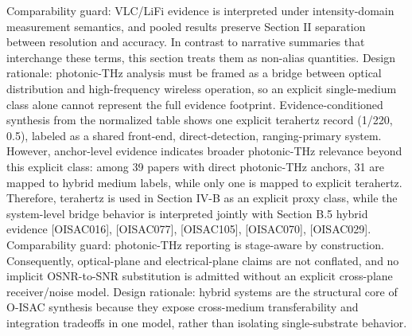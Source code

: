 {}Comparability guard: VLC/LiFi evidence is interpreted under intensity-domain measurement semantics, and pooled results preserve Section II separation between resolution and accuracy. In contrast to narrative summaries that interchange these terms, this section treats them as non-alias quantities.\markdownRendererInterblockSeparator
{}
\markdownRendererSectionEnd \markdownRendererSectionBegin
{}\markdownRendererInterblockSeparator
{}Design rationale: photonic-THz analysis must be framed as a bridge between optical distribution and high-frequency wireless operation, so an explicit single-medium class alone cannot represent the full evidence footprint.\markdownRendererParagraphSeparator
{}Evidence-conditioned synthesis from the normalized table shows one explicit terahertz record (1/220, 0.5\markdownRendererPercentSign{}), labeled as a shared front-end, direct-detection, ranging-primary system. However, anchor-level evidence indicates broader photonic-THz relevance beyond this explicit class: among 39 papers with direct photonic-THz anchors, 31 are mapped to hybrid medium labels, while only one is mapped to explicit terahertz. Therefore, terahertz is used in Section IV-B as an explicit proxy class, while the system-level bridge behavior is interpreted jointly with Section B.5 hybrid evidence [O\markdownRendererUnderscore{}ISAC\markdownRendererUnderscore{}016], [O\markdownRendererUnderscore{}ISAC\markdownRendererUnderscore{}077], [O\markdownRendererUnderscore{}ISAC\markdownRendererUnderscore{}105], [O\markdownRendererUnderscore{}ISAC\markdownRendererUnderscore{}070], [O\markdownRendererUnderscore{}ISAC\markdownRendererUnderscore{}029].\markdownRendererParagraphSeparator
{}Comparability guard: photonic-THz reporting is stage-aware by construction. Consequently, optical-plane and electrical-plane claims are not conflated, and no implicit OSNR-to-SNR substitution is admitted without an explicit cross-plane receiver/noise model.\markdownRendererInterblockSeparator
{}
\markdownRendererSectionEnd \markdownRendererSectionBegin
{}\markdownRendererInterblockSeparator
{}Design rationale: hybrid systems are the structural core of O-ISAC synthesis because they expose cross-medium transferability and integration tradeoffs in one model, rather than isolating single-substrate behavior.\markdownRendererParagraphSeparator

